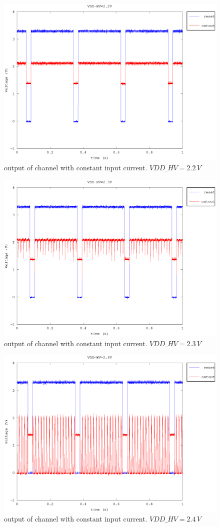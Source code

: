 \documentclass{article}
\begin{document}
\begin{figure}[H]
	\centering
	\includegraphics[width=0.8\linewidth]{fig/out_2-2V.eps}
	\caption{output of channel with constant input current. $VDD\_HV=2.2\,V$}
	\label{fig:out_2-2V}
\end{figure}

\begin{figure}[H]
	\centering
	\includegraphics[width=0.8\linewidth]{fig/out_2-3V.eps}
	\caption{output of channel with constant input current. $VDD\_HV=2.3\,V$}
	\label{fig:out_2-3V}
\end{figure}

\begin{figure}[H]
	\centering
	\includegraphics[width=0.8\linewidth]{fig/out_2-4V.eps}
	\caption{output of channel with constant input current. $VDD\_HV=2.4\,V$}
	\label{fig:out_2-4V}
\end{figure}
\end{document}
